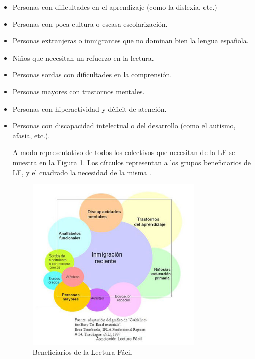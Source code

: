 \begin{itemize}
	\item Personas con dificultades en el aprendizaje (como la dislexia, etc.)	 
	\item Personas con poca cultura o escasa escolarización.	 
	\item Personas extranjeras o inmigrantes que no dominan bien la lengua española.
	\item Niños que necesitan un refuerzo en la lectura.
	\item Personas sordas con dificultades en la comprensión.
	\item Personas mayores con trastornos mentales.
	\item Personas con hiperactividad y  déficit de atención. 
	\item Personas con discapacidad intelectual o del desarrollo (como el autismo, afasia, etc.). 
	
	A modo representativo de todos los colectivos que necesitan de la LF se muestra en la Figura \ref{fig:destinatarios}. Los círculos representan a los grupos beneficiarios de LF, y el cuadrado la necesidad de la misma \citep{nomura2010guidelines}. 
	\begin{figure}[htb]
		\centering
		\includegraphics[width=0.8\textwidth]{Imagenes/Ejemplos/destinatarios}
		\caption{Beneficiarios de la Lectura Fácil}
		\label{fig:destinatarios}
	\end{figure}
	

	
\end{itemize}


